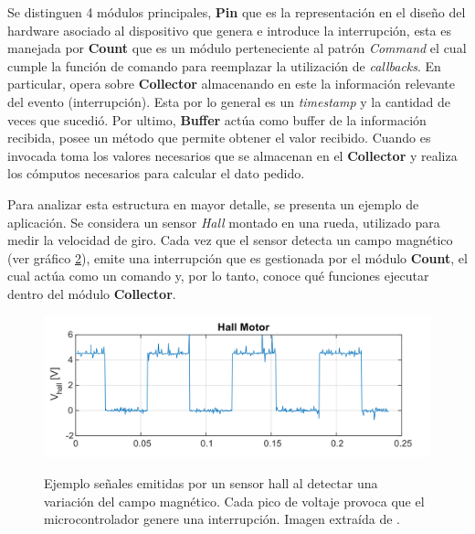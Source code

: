 \begin{figure}[h!]
\label{fig:ConnectBufferToMCU}
\end{figure}


Se distinguen 4 módulos principales, \textbf{Pin} que es la representación en el diseño del hardware asociado al dispositivo que genera e introduce la interrupción, esta es manejada por \textbf{Count} que es un módulo perteneciente al patrón \textit{Command} el cual cumple la función de comando para reemplazar la utilización de \textit{callbacks}. En particular, opera sobre \textbf{Collector} almacenando en este la información relevante del evento (interrupción). Esta por lo general es un \textit{timestamp} y la cantidad de veces que sucedió.  Por ultimo, \textbf{Buffer} actúa como buffer de la información recibida, posee un método que permite obtener el valor recibido. Cuando es invocada toma los valores necesarios que se almacenan en el \textbf{Collector} y realiza los cómputos necesarios para calcular el dato pedido.

Para analizar esta estructura en mayor detalle, se presenta un ejemplo de aplicación. Se considera un sensor \textit{Hall} montado en una rueda, utilizado para medir la velocidad de giro. Cada vez que el sensor detecta un campo magnético (ver gráfico \ref{hall}), emite una interrupción que es gestionada por el módulo \textbf{Count}, el cual actúa como un comando y, por lo tanto, conoce qué funciones ejecutar dentro del módulo \textbf{Collector}.

\begin{figure}[h]
    
    \caption{Ejemplo señales emitidas por un sensor hall al detectar una variación del campo magnético. Cada pico de voltaje provoca que el microcontrolador genere una interrupción. Imagen extraída de \cite{disenioViejo2}.}
    \centering
    \includegraphics[width=0.8\linewidth]{sensorHall.png}
    \label{hall}
\end{figure}


